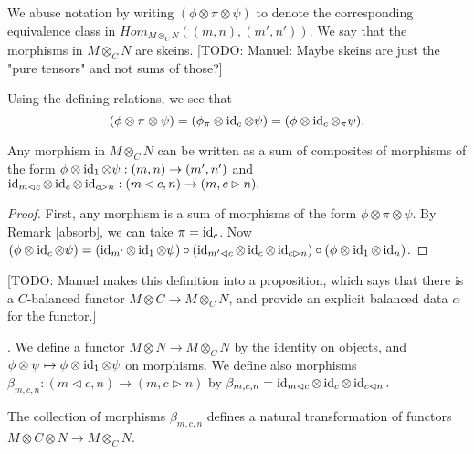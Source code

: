 \begin{remark}
 
We abuse notation by writing $(\phi\otimes\pi\otimes\psi)$ to denote the corresponding equivalence class in $Hom_{M\otimes_C N}((m,n),(m',n'))$. We say that the morphisms in $M\otimes_C N$ are skeins. [TODO: Manuel: Maybe skeins are just the "pure tensors" and not sums of those?]\end{remark}


\begin{remark}\label{absorb}
  
  Using the defining relations, we see
  that
  \[
    (\phi\otimes\pi\otimes\psi) =
    (\phi_{\pi}\otimes\operatorname{id}_{\bar{c}}\otimes\psi) =
    (\phi\otimes\operatorname{id}_c\otimes{_{\pi}\psi}).
  \]
\end{remark}

\begin{lemma}\label{decompose}

  Any morphism in $M\otimes_C N$ can be written as a sum of composites of
  morphisms of the form $\phi\otimes\operatorname{id}_{1}\otimes\psi:(m,n)\to(m',n')$ and
  $\operatorname{id}_{m\lhd c}\otimes\operatorname{id}_c\otimes\operatorname{id}_{c\rhd n}:(m\lhd c,n)\to(m,c\rhd n).$
\end{lemma}

\begin{proof}
  First, any morphism is a sum of morphisms of the form
  $\phi\otimes\pi\otimes\psi$. By Remark \ref{absorb}, we can take
  $\pi=\operatorname{id}_c$. Now
  $(\phi\otimes\operatorname{id}_c\otimes\psi)
  =
  (\operatorname{id}_{m'}\otimes\operatorname{id}_1\otimes\psi)
  \circ
  (\operatorname{id}_{m'\lhd c}\otimes\operatorname{id}_c\otimes\operatorname{id}_{c\rhd n})
  \circ
  (\phi\otimes\operatorname{id}_1\otimes\operatorname{id}_n)$.
\end{proof}

[TODO: Manuel makes this definition into a proposition, which says that there
is a $C$-balanced functor $M \otimes C \to M \otimes_{C} N$, and provide an
explicit balanced data $\alpha$ for the functor.]
\begin{definition}\label{definition/preskeinification}.
  We define a functor $M\otimes N\to M\otimes_C N$ by the identity on objects,
  and $\phi\otimes\psi\mapsto\phi\otimes\operatorname{id}_1\otimes\psi$ on morphisms. We
  define also morphisms $\beta_{m,c,n}:(m\lhd c,n)\to (m, c \rhd n)$ by
  $\beta_{m,c,n}=\operatorname{id}_{m\lhd c}\otimes\operatorname{id}_c\otimes\operatorname{id}_{c\lhd n}.$
\end{definition}

\begin{lemma}
  The collection of morphisms $\beta_{m,c,n}$ defines a natural transformation
  of functors $M\otimes C \otimes N\to M\otimes_C N$.
\end{lemma}

